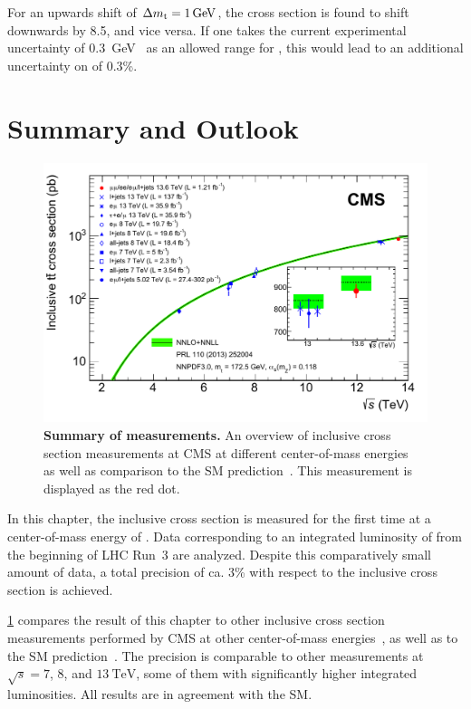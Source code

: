 For an upwards shift of $\Delta \mt = \SI{1}{\GeV}$, the \ttbar cross section is found to shift downwards by \SI{8.5}{\pb}, and vice versa. If one takes the current experimental uncertainty of \SI{0.3}{\GeV}~\cite{PDG:2022pth} as an allowed range for \mt, this would lead to an additional uncertainty on \sigmatt of 0.3\%.

\section{Summary and Outlook}
\label{sec:ttxs:summary}

\begin{figure}[!ht]
    \centering
    \includegraphics[width=0.8\linewidth]{figures/ttxs/tt_curve.pdf}
    \caption{\textbf{Summary of \sigmatt measurements.} An overview of inclusive \ttbar cross section measurements at CMS at different center-of-mass energies~\cite{CMS:TOP-11-007, CMS:TOP-14-018, CMS:TOP-12-006, CMS:TOP-13-004, CMS:TOP-17-001, CMS:TOP-18-005, CMS:TOP-20-001, CMS:TOP-20-004} as well as comparison to the SM prediction~\cite{Czakon:2013goa}. This measurement is displayed as the red dot.}
    \label{fig:ttxs:ttcurve}
\end{figure}

In this chapter, the inclusive \ttbar cross section is measured for the first time at a center-of-mass energy of \sqrtsRIII. Data corresponding to an integrated luminosity of \lumiRIII from the beginning of LHC Run~3 are analyzed. Despite this comparatively small amount of data, a total precision of ca. 3\% with respect to the inclusive cross section is achieved.

\cref{fig:ttxs:ttcurve} compares the result of this chapter to other inclusive \ttbar cross section measurements performed by CMS at other center-of-mass energies~\cite{CMS:TOP-11-007, CMS:TOP-14-018, CMS:TOP-12-006, CMS:TOP-13-004, CMS:TOP-17-001, CMS:TOP-18-005, CMS:TOP-20-001, CMS:TOP-20-004}, as well as to the SM prediction~\cite{Czakon:2013goa}. The precision is comparable to other measurements at $\sqrt{s} = 7$, $8$, and $\SI{13}{\TeV}$, some of them with significantly higher integrated luminosities. All results are in agreement with the SM.

